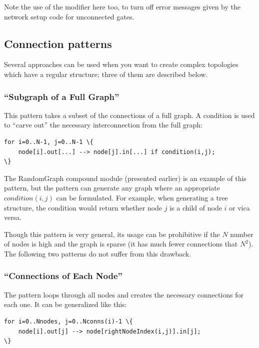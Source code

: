 Note the use of the  modifier
here too, to turn off error messages given by the network setup code
for unconnected gates.


\subsection{Connection patterns}


Several approaches can be used when you want to create complex
topologies which have a regular structure; three of them are
described below.


\subsubsection{``Subgraph of a Full Graph''}


This pattern takes a subset of the connections of a full graph.  A
condition is used to ``carve out'' the necessary interconnection from
the full graph:

\begin{Verbatim}[commandchars=\\\{\}]
for i=0..N-1, j=0..N-1 \{
    node[i].out[...] --> node[j].in[...] if condition(i,j);
\}
\end{Verbatim}

The RandomGraph compound module (presented earlier) is an example of
this pattern, but the pattern can generate any graph where an
appropriate $condition(i,j)$ can be formulated. For example,
when generating a tree structure, the condition
would return whether node $j$ is a child of node $i$ or
vica versa.

Though this pattern is very general, its usage can be prohibitive if
the $N$ number of nodes is high and the graph is sparse (it has
much fewer connections that $N^2$). The following
two patterns do not suffer from this drawback.


\subsubsection{``Connections of Each Node''}

The pattern loops through all nodes and creates the necessary
connections for each one. It can be generalized like this:

\begin{Verbatim}[commandchars=\\\{\}]
for i=0..Nnodes, j=0..Nconns(i)-1 \{
    node[i].out[j] --> node[rightNodeIndex(i,j)].in[j];
\}
\end{Verbatim}

